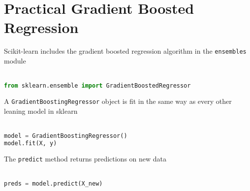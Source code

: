 \section{Practical Gradient Boosted Regression}
%
\begin{frame}[fragile]
Scikit-learn includes the gradient boosted regression algorithm in the \texttt{ensembles} module\\~\\

\begin{lstlisting}[language=python]
from sklearn.ensemble import GradientBoostedRegressor
\end{lstlisting}

\end{frame}
%
\begin{frame}[fragile]
A \texttt{GradientBoostingRegressor} object is fit in the same way as every other leaning model in sklearn\\~\\

\begin{lstlisting}[language=python]
model = GradientBoostingRegressor()
model.fit(X, y)
\end{lstlisting}

\end{frame}
%
\begin{frame}[fragile]
The \texttt{predict} method returns predictions on new data\\~\\

\begin{lstlisting}[language=python]
preds = model.predict(X_new)
\end{lstlisting}
\end{frame}
%

